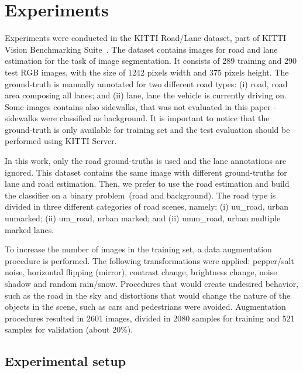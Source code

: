 \section{Experiments}
\label{sec:experiments}

Experiments were conducted in the KITTI Road/Lane dataset, part of KITTI Vision Benchmarking Suite~\cite{KITTI}. The dataset  contains  images for road and lane estimation for the task of image segmentation. It consists of 289 training and 290 test RGB images, with the size of 1242 pixels width and 375 pixels height.  The ground-truth is manually annotated for two different road types: (i) road, road area composing all lanes; and (ii) lane, lane the vehicle is currently driving on. Some images contains also sidewalks, that was not evaluated in this paper - sidewalks were classified as background. It is important to notice that the ground-truth is only available for training set and the test evaluation should be performed using KITTI Server.

In this work, only the road ground-truths is used and the lane annotations are ignored. This dataset contains the same image with different ground-truths for lane and road estimation.    Then, we prefer to use the road estimation and build the classifier on a binary problem~(road and background). The road type is divided in three different categories of road scenes, namely: (i) uu\_road, urban unmarked; (ii) um\_road, urban marked; and (ii) umm\_road, urban multiple marked lanes.  

To increase the number of images in the training set, a data augmentation procedure is performed. The following transformations were applied: pepper/salt noise, horizontal flipping (mirror), contrast change, brightness change, noise shadow and random rain/snow. Procedures that would create undesired behavior, such as the road in the sky and distortions that would change the nature of the objects in the scene, such as cars and pedestrians were avoided. Augmentation procedures resulted in 2601 images, divided in 2080 samples for training and 521 samples for validation (about 20\%). 


\subsection{Experimental setup}
   
